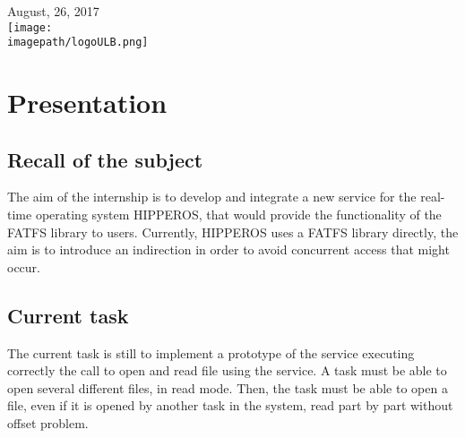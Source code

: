 \documentclass[12pt]{article}
\begin{document}
\begin{titlepage}

{\large August, 26, 2017 }\\[2cm] %



\texttt{[image: \\imagepath/logoULB.png]}\\[1cm] 
 

\vfill %

\end{titlepage}

\newpage


\pagestyle{fancy}
\fancyhf{}
\setlength\headheight{15pt}
\fancyhead[R]{}
\fancyfoot[L]{\today}
\fancyfoot[R]{\thepage}

\newpage

\section{Presentation}
\subsection{Recall of the subject}
The aim of the internship is to develop and integrate a new service for the real-time operating system HIPPEROS, 
that would provide the functionality of the FATFS library to users.
Currently, HIPPEROS uses a FATFS library directly, the aim is to introduce an indirection in order to 
avoid concurrent access that might occur.

\subsection{Current task}
The current task is still to implement a prototype of the service 
executing correctly the call to open and read file using the service. 
A task must be able to open several different files, in read mode.
Then, the task must be able to open a file, even if it is opened 
by another task in the system, read part by part without offset problem.
\end{document}
